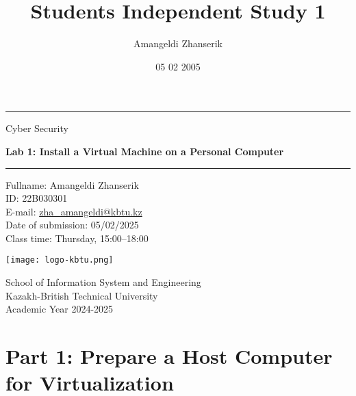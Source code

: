 \documentclass{article}
\title{Students Independent Study 1}
\author{Amangeldi Zhanserik}
\date{05 02 2005}
\begin{document}
\begin{titlepage}
    \centering

    \vspace*{1cm}

    \rule{\textwidth}{1pt}

    \vspace{2\baselineskip}

    {\huge  Cyber Security } \\

    \vspace{1\baselineskip}

    {\huge \textbf{ Lab 1: Install a Virtual Machine on a Personal Computer}}

    \vspace{2\baselineskip}

    \rule{\textwidth}{1pt}

    \vspace{1cm}

    \large

    \begin{flushleft}
        \begin{minipage}{.8\textwidth}
            \raggedright
            Fullname: Amangeldi Zhanserik \\
            ID: 22B030301 \\
            E-mail: {\normalsize \url{zha_amangeldi@kbtu.kz}} \\
            Date of submission: 05/02/2025 \\
            Class time: Thursday, 15:00--18:00 \\
        \end{minipage}%
    \end{flushleft}

    \vspace{2cm}

    \texttt{[image: logo-kbtu.png]}

    \vfill

    School of Information System and Engineering \\
    Kazakh-British Technical University \\
    Academic Year 2024-2025 \\
\end{titlepage}

\newpage

\section*{Part 1: Prepare a Host Computer for Virtualization}
\end{document}
